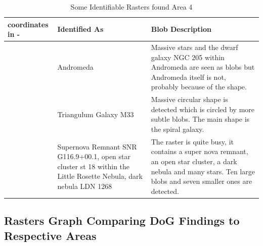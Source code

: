 \begin{table}[H]
    \centering
    \caption{Some Identifiable Rasters found Area 4}
    \label{tb:identified-rasters-area4}
    \begin{tabular}{L{0.2\textwidth}L{0.3\textwidth}L{0.4\textwidth}}
        \toprule
        \textbf{coordinates in  - } & \textbf{Identified As}                                                                                             & \textbf{Blob Description}                                                                                                                                            \\
        \midrule
                                   & Andromeda                                                                                                          & Massive stars and the dwarf galaxy NGC 205 within Andromeda are seen as blobs but Andromeda itself is not, probably because of the shape.                            \\
                                   & Triangulum Galaxy M33                                                                                              & Massive circular shape is detected which is circled by more subtle blobs. The main shape is the spiral galaxy.                                                       \\
                           & Supernova Remnant SNR G116.9+00.1,  open star cluster st 18 within the Little Rosette Nebula, dark nebula LDN 1268 & The raster is quite busy, it contains a super nova remnant, an open star cluster, a dark nebula and many stars. Ten large blobs and seven smaller ones are detected. \\
        \bottomrule
    \end{tabular}
\end{table}

\subsection{Rasters Graph Comparing DoG Findings to Respective Areas}

